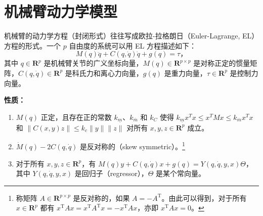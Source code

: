 \section{机械臂动力学模型}\label{6Aref}

机械臂的动力学方程（封闭形式）往往写成欧拉-拉格朗日（Euler-Lagrange, EL）方程的形式。一个 $p$ 自由度的系统可以用 EL 方程描述如下：
\begin{equation} \label{robotic_model}
    M(q) \ddot{q} + C(q, \dot{q}) \dot{q} + g(q) = \tau \text{，}
\end{equation}
其中 $q \in \mathbf{R}^p$ 是机械臂关节的广义坐标向量，$M(q) \in \mathbf{R}^{p \times p}$ 是对称正定的惯量矩阵，$C(q, \dot{q}) \in \mathbf{R}^p$ 是科氏力和离心力向量，$g(q)$ 是重力向量，$\tau \in \mathbf{R}^p$ 是控制力向量。

\noindent\textbf{性质：}
\begin{enumerate}
    \item $M(q)$ 正定，且存在正的常数 $k_{\underline{m}}$、$k_{\overline{m}}$ 和 $k_C$ 使得 $k_{\underline{m}} x^T x \leq x^T M x \leq k_{\overline{m}} x^T x$ 和 $\| C (x, y) z \| \leq k_c \| y \| \| z \|$ 对所有 $x, y , z \in \mathbf{R}^p$ 成立。
    \item $\dot{M} (q) - 2 C (q, \dot{q})$ 是反对称的（skew symmetric）。\footnote{称矩阵 $A \in \mathbf{R}^{p \times p}$ 是反对称的，如果 $A = - A^\mathrm{T}$。由此可以得到，对于所有 $x \in \mathbf{R}^p$ 都有 $x^\mathrm{T} A x = x^\mathrm{T} A^\mathrm{T} x = - x^\mathrm{T} A x$，亦即 $x^\mathrm{T} A x = 0$。}
    \item 对于所有 $x, y , z \in \mathbf{R}^p$，有 $M (q) y + C (q, \dot{q}) x + g (q) = Y (q, \dot{q}, y, x) \Theta$，其中 $Y (q, \dot{q}, y, x)$ 是回归子（regressor），$\Theta$ 是某个常向量。
\end{enumerate}
